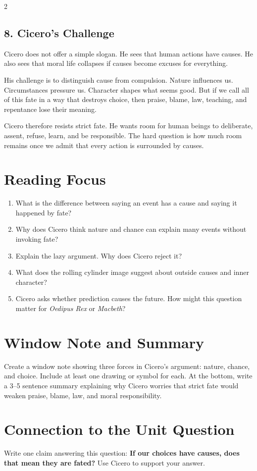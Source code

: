 \documentclass[12pt]{article}
\begin{document}
\begin{multicols}{2}
\subsection*{8. Cicero's Challenge}
Cicero does not offer a simple slogan. He sees that human actions have causes. He also sees that moral life collapses if causes become excuses for everything.

His challenge is to distinguish cause from compulsion. Nature influences us. Circumstances pressure us. Character shapes what seems good. But if we call all of this fate in a way that destroys choice, then praise, blame, law, teaching, and repentance lose their meaning.

Cicero therefore resists strict fate. He wants room for human beings to deliberate, assent, refuse, learn, and be responsible. The hard question is how much room remains once we admit that every action is surrounded by causes.

\section*{Reading Focus}
\begin{enumerate}[leftmargin=*]
\item What is the difference between saying an event has a cause and saying it happened by fate?
\item Why does Cicero think nature and chance can explain many events without invoking fate?
\item Explain the lazy argument. Why does Cicero reject it?
\item What does the rolling cylinder image suggest about outside causes and inner character?
\item Cicero asks whether prediction causes the future. How might this question matter for \textit{Oedipus Rex} or \textit{Macbeth}?
\end{enumerate}

\section*{Window Note and Summary}
Create a window note showing three forces in Cicero's argument: nature, chance, and choice. Include at least one drawing or symbol for each. At the bottom, write a 3--5 sentence summary explaining why Cicero worries that strict fate would weaken praise, blame, law, and moral responsibility.

\section*{Connection to the Unit Question}
Write one claim answering this question: \textbf{If our choices have causes, does that mean they are fated?} Use Cicero to support your answer.
\end{multicols}
\end{document}
